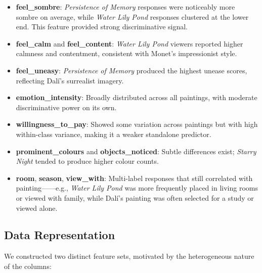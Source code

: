 \documentclass[11pt,letterpaper]{article}
\begin{document}
\begin{itemize}
  \item \textbf{feel\_sombre}: \emph{Persistence of Memory} responses were
        noticeably more sombre on average, while \emph{Water Lily Pond} responses
        clustered at the lower end. This feature provided strong discriminative signal.
  \item \textbf{feel\_calm} and \textbf{feel\_content}: \emph{Water Lily Pond}
        viewers reported higher calmness and contentment, consistent with Monet's
        impressionist style.
  \item \textbf{feel\_uneasy}: \emph{Persistence of Memory} produced the highest
        unease scores, reflecting Dalí's surrealist imagery.
  \item \textbf{emotion\_intensity}: Broadly distributed across all paintings, with
        moderate discriminative power on its own.
  \item \textbf{willingness\_to\_pay}: Showed some variation across paintings but
        with high within-class variance, making it a weaker standalone predictor.
  \item \textbf{prominent\_colours} and \textbf{objects\_noticed}: Subtle
        differences exist; \emph{Starry Night} tended to produce higher colour counts.
  \item \textbf{room}, \textbf{season}, \textbf{view\_with}: Multi-label responses
        that still correlated with painting——e.g., \emph{Water Lily Pond} was more
        frequently placed in living rooms or viewed with family, while Dalí's painting
        was often selected for a study or viewed alone.
\end{itemize}


\subsection{Data Representation}

We constructed two distinct feature sets, motivated by the heterogeneous nature of
the columns:
\end{document}
